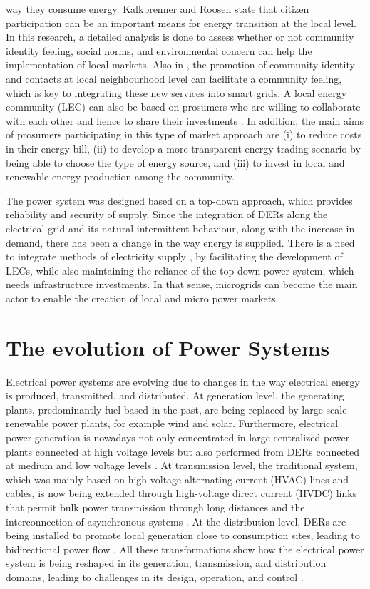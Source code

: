 way they consume energy. Kalkbrenner and Roosen \cite{kalkbrenner2016citizens} state that citizen participation can be an important means for energy transition at the local level. In this research, a detailed analysis is done to assess whether or not community identity feeling, social norms, and environmental concern can help the implementation of local markets. Also in \cite{kalkbrenner2016citizens}, the promotion of community identity and contacts at local neighbourhood level can facilitate a community feeling, which is key to integrating these new services into smart grids. A local energy community (LEC) can also be based on prosumers who are willing to collaborate with each other and hence to share their investments \cite{sousa2018peer}. In addition, the main aims of prosumers participating in this type of market approach are (i) to reduce costs in their energy bill, (ii) to develop a more transparent energy trading scenario by being able to choose the type of energy source, and (iii) to invest in local and renewable energy production among the community.

The power system was designed based on a top-down approach, which provides reliability and security of supply. Since the integration of DERs along the electrical grid and its natural intermittent behaviour, along with the increase in demand, there has been a change in the way energy is supplied. There is a need to integrate methods of electricity supply \cite{peng2017electricity}, by facilitating the development of LECs, while also maintaining the reliance of the top-down power system, which needs infrastructure investments. In that sense, microgrids can become the main actor to enable the creation of local and micro power markets. 

\section{The evolution of Power Systems}

Electrical power systems are evolving due to changes in the way electrical energy is produced, transmitted, and distributed. At generation level, the generating plants, predominantly fuel-based in the past, are being replaced by large-scale renewable power plants, for example wind and solar. Furthermore, electrical power generation is nowadays not only concentrated in large centralized power plants connected at high voltage levels but also performed from DERs connected at medium and low voltage levels \cite{Vittal2012}. At transmission level, the traditional system, which was mainly based on high-voltage alternating current (HVAC) lines and cables, is
now being extended through high-voltage direct current (HVDC) links that permit bulk power transmission through long distances and the interconnection of asynchronous systems \cite{van2016hvdc}. At the distribution level, DERs are being installed to promote local generation close to consumption sites, leading to bidirectional power flow \cite{series2009microgrids}. All these transformations show how the electrical power system is being reshaped in its generation, transmission, and distribution domains, leading to challenges in its design, operation, and control \cite{miller2015status, farrokhabadi2018microgrid}. 

